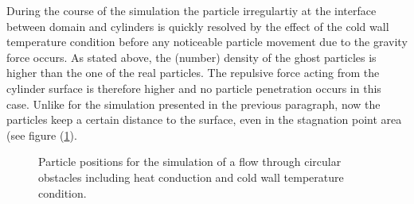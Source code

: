 \documentclass{report}
\begin{document}
During the course of the simulation the particle irregulartiy at the interface between domain and cylinders is quickly resolved by the effect of the cold wall temperature condition before any noticeable particle movement due to the gravity force occurs. As stated above, the (number) density of the ghost particles is higher than the one of the real particles. %
The repulsive force acting from the cylinder surface is therefore higher and no particle penetration occurs in this case. Unlike for the simulation presented in the previous paragraph, now the particles keep a certain distance to the surface, even in the stagnation point area (see figure (\ref{fig:PorositiesResults_Pos_Hex_pseudoHex2}). 

\begin{figure}[!htbp]

\centering
\label{fig:PorositiesResults_Pos_Hex_pseudoHex2}

\caption[particle positions for Porosities]{Particle positions for the simulation of a flow through circular obstacles including heat conduction and cold wall temperature condition.}

\end{figure}
\end{document}

